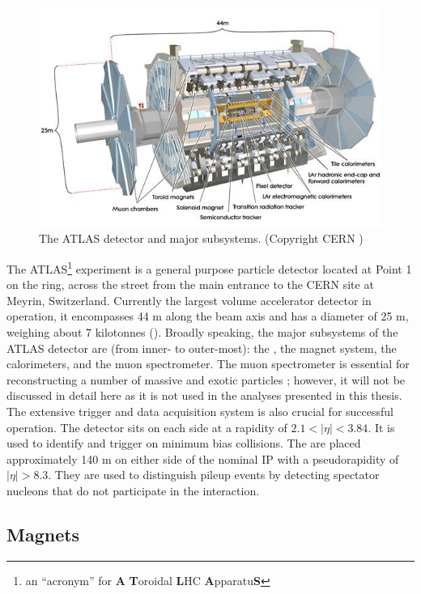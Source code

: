 \begin{figure}[t]
\includegraphics{ATLAS_layout.jpg}
\caption{The ATLAS detector and major subsystems. (Copyright CERN \cite{Pequenao:1095924})}
\label{fig:atlas_layout}
\end{figure}

The ATLAS\footnote{an ``acronym'' for \textbf{A} \textbf{T}oroidal \textbf{L}HC \textbf{A}pparatu\textbf{S}} experiment is a general purpose particle detector \cite{Aad:2008zzm} located at Point 1 on the \lhc ring, across the street from the main entrance to the CERN site at Meyrin, Switzerland.
Currently the largest volume accelerator detector in operation, it encompasses 44 m along the beam axis and has a diameter of 25 m, weighing about 7 kilotonnes ().
Broadly speaking, the major subsystems of the ATLAS detector are (from inner- to outer-most): the \id, the magnet system, the calorimeters, and the muon spectrometer.
The muon spectrometer is essential for reconstructing a number of massive and exotic particles \cite{ATLAS:1997ad}; however, it will not be discussed in detail here as it is not used in the analyses presented in this thesis.
The extensive trigger and data acquisition system is also crucial for successful operation.
The \mbts detector sits on each side at a rapidity of $2.1 < |\eta| < 3.84$.
It is used to identify and trigger on minimum bias collisions.
The \zdc are placed approximately 140 m on either side of the nominal IP with a pseudorapidity of $|\eta| > 8.3$.
They are used to distinguish pileup events by detecting spectator nucleons that do not participate in the interaction.


\subsection{Magnets}
\label{subsec:atlas_magnet}

